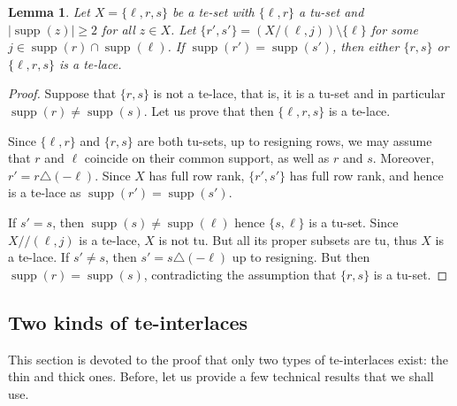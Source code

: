 \documentclass[11pt,a4paper]{amsart}
\renewcommand*{\geq}{\geqslant}
\theoremstyle{plain}
\newtheorem{lemma}[theorem]{Lemma}
\theoremstyle{definition}
\DeclareMathOperator{\supp}{supp}
\begin{document}
\begin{lemma}\label{3rows}
Let $X=\{\ell,r,s\}$ be a te-set with $\{\ell,r\}$ a tu-set and $|\supp(z)|\geq 2$ for all $z\in X$.
Let $\{r',s'\}=(X/(\ell,j))\setminus\{\ell\}$ for some $j\in\supp(r)\cap\supp(\ell)$.
If $\supp(r')=\supp(s')$, then either $\{r,s\}$ or $\{\ell,r,s\}$ is a te-lace.
\end{lemma}
\begin{proof}
Suppose that $\{r,s\}$ is not a te-lace, that is, it is a tu-set and in particular $\supp(r)\neq\supp(s)$. 
Let us prove that then $\{\ell,r,s\}$ is a te-lace.

Since $\{\ell, r\}$ and $\{r,s\}$ are both tu-sets, up to resigning rows, we may assume that $r$ and $\ell$ coincide on their common support, as well as $r$ and $s$.
Moreover, $r'=r\triangle(-\ell)$.
Since $X$ has full row rank, $\{r',s'\}$ has full row rank, and hence is a te-lace as $\supp(r')=\supp(s')$.

If $s'=s$, then $\supp(s)\neq \supp(\ell)$ hence $\{s,\ell\}$ is a tu-set. 
Since $X/\!\!/(\ell,j)$ is a te-lace, $X$ is not tu.
But all its proper subsets are tu, thus $X$ is a te-lace.
If $s'\neq s$, then $s'=s\triangle (-\ell)$ up to resigning.
But then $\supp(r)=\supp(s)$, contradicting the assumption that $\{r,s\}$ is a tu-set.
\end{proof}

\subsection{Two kinds of te-interlaces}

This section is devoted to the proof that only two types of te-interlaces exist: the thin and thick ones.
Before, let us provide a few technical results that we shall use.
\medskip
\end{document}
